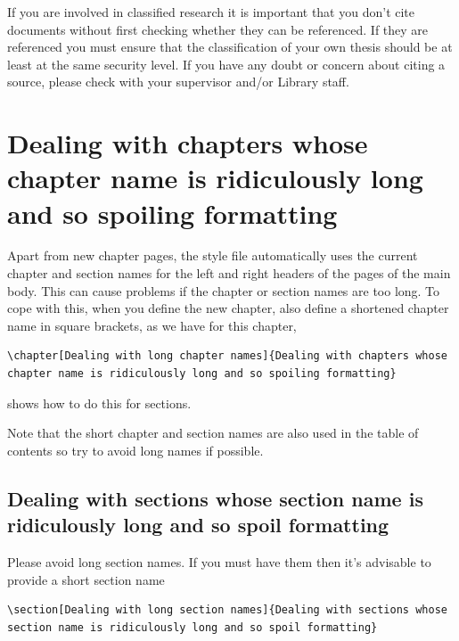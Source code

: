 \documentclass[12pt,oneside]{book} %
\begin{document}
If you are involved in classified research it is important that you don’t cite documents without first checking whether they can be referenced. If they are referenced you must ensure that the classification of your own thesis should be at least at the same security level. If you have any doubt or concern about citing a source, please check with your supervisor and/or Library staff.

%

%






\chapter[Dealing with long chapter names]{Dealing with chapters whose 
chapter name is ridiculously long and so spoiling formatting}
Apart from new chapter pages, the style file automatically uses the current chapter and section names for the left and right headers of the pages of the main body. This can cause problems if the chapter or section names are too long. To cope with this, when you define the new chapter, also define a shortened chapter name in square brackets, as we have for this chapter,
\begin{verbatim}
\chapter[Dealing with long chapter names]{Dealing with chapters whose 
chapter name is ridiculously long and so spoiling formatting}
\end{verbatim}
 shows how to do this for sections. 

Note that the short chapter and section names are also used in the table of contents so try to avoid long names if possible.

\newpage
\section[Dealing with long section names]{Dealing with sections whose 
section name is ridiculously long and so spoil formatting}
\label{sec:longSection}
Please avoid long section names. If you must have them then it's advisable to provide a short section name
\begin{verbatim}
\section[Dealing with long section names]{Dealing with sections whose 
section name is ridiculously long and so spoil formatting}
\end{verbatim}
\end{document}
